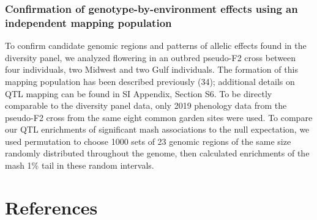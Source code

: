 \documentclass[
  9pt,
  twocolumn,
  twoside]{pnas-new}
\begin{document}
\subsubsection{Confirmation of genotype-by-environment effects using an
independent mapping
population}\label{confirmation-of-genotype-by-environment-effects-using-an-independent-mapping-population}

To confirm candidate genomic regions and patterns of allelic effects
found in the diversity panel, we analyzed flowering in an outbred
pseudo-F2 cross between four individuals, two Midwest and two Gulf
individuals. The formation of this mapping population has been described
previously (34); additional details on QTL mapping can be found in SI
Appendix, Section S6. To be directly comparable to the diversity panel
data, only 2019 phenology data from the pseudo-F2 cross from the same
eight common garden sites were used. To compare our QTL enrichments of
significant mash associations to the null expectation, we used
permutation to choose 1000 sets of 23 genomic regions of the same size
randomly distributed throughout the genome, then calculated enrichments
of the mash 1\% tail in these random intervals.

\section{References}\label{references}

\bibsplit[2]
\end{document}
